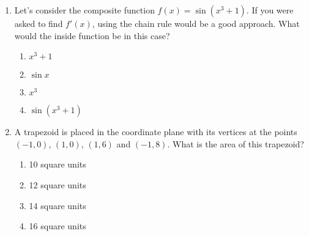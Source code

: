 \documentclass{article}
\begin{document}
\begin{enumerate}
\begin{enumerate}
  \end{enumerate}


\item Let's consider the composite function $f(x)=\sin(x^3+1)$. If you were asked to find $f'(x)$, using the chain rule would be a good approach. What would the inside function be in this case?

  \begin{enumerate}
  
  \item $x^3+1$ %
  \item $\sin x$
  \item $x^3$
  \item $\sin(x^3+1)$
  \end{enumerate}


\item A trapezoid is placed in the coordinate plane with its vertices at the points $(-1,0)$, $(1,0)$, $(1,6)$ and $(-1,8)$. What is the area of this trapezoid?

  \begin{enumerate} %
  
  \item 10 square units
  \item 12 square units
  \item 14 square units %
  \item 16 square units
  
  \end{enumerate}

\end{enumerate}
\end{document}
